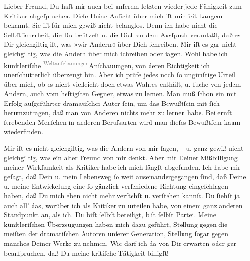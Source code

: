 \pstart
           Lieber Freund, Du haſt mir auch bei unſerem letzten \label{K_L03475-10v}\label{K_L03475-10} wieder jede Fähigkeit zum Kritiker abgeſprochen. Dieſe Deine
               Anſicht über mich iſt mir{ }ſeit Langem bekannt. Sie iſt für mich gewiß nicht
               belanglos. Denn ich habe nicht die Selbſtſicherheit, die Du beſitzeſt u. die Dich zu
               dem Ausſpuch veranlaßt, daß es {\pb}Dir gleichgiltig
               iſt, was  »wir Andern« über Dich{ }ſchreiben. Mir
               iſt es gar nicht gleichgiltig, was die Andern über mich{ }ſchreiben oder{ }ſagen. Wohl
               habe ich künſtleriſche \substVorne{}\textsuperscript{\textcolor{gray}{Weltanſchauungen}}\substDazwischen{}Anſchauungen\substHinten{}, von deren Richtigkeit ich unerſchütterlich überzeugt bin. Aber ich prüfe
               jedes noch{ }ſo ungünſtige Urteil über mich, ob es nicht vielleicht doch etwas Wahres
               enthält, u.{ }ſuche von jedem Andern, auch vom heftigſten Gegner, etwas zu lernen. Man
               muß{ }ſchon ein mit Erfolg aufgeführter dramatiſcher Autor{ }ſein, {\pb}um das Bewußtſein mit{ }ſich herumzutragen, daß
               man von Anderen nichts mehr zu lernen habe. Bei ernſt{ }ſtrebenden Menſchen in anderen
               Berufsarten wird man dieſes Bewußtſein kaum wiederfinden.\pend
           
\pstart
           Mir iſt es nicht gleichgiltig, was die Andern von mir{ }ſagen, – u. ganz gewiß nicht
               gleichgiltig, was ein alter Freund von mir denkt. Aber mit Deiner Mißbilligung meiner
               Wirkſamkeit als Kritiker habe ich mich \introOben{}längſt\introOben{} abgefunden.
               Ich habe mir geſagt, daß Dein u. mein Lebensweg{ }ſo
               weit auseinandergegangen{ }ſind, {\pb}daß Deine u. meine
               Entwickelung eine{ }ſo gänzlich verſchiedene Richtung eingeſchlagen haben, daß Du mich
               eben nicht mehr verſtehſt u. verſtehen kannſt. Du{ }ſiehſt ja auch all’ das, worüber
               ich als Kritiker zu urteilen habe, von einem ganz anderen Standpunkt an, als ich. Du
               biſt{ }ſelbſt beteiligt, biſt{ }ſelbſt Partei. Meine künſtleriſchen Überzeugungen haben
               mich dazu geführt, Stellung gegen  die meiſten der dramatiſchen Autoren unſerer Generation, Stellung{ }ſogar gegen
               manches Deiner Werke zu nehmen. {\pb}Wie darf ich da
               von Dir erwarten oder gar beanſpruchen, daß Du meine kritiſche Tätigkeit
               billigſt!\pend
           
